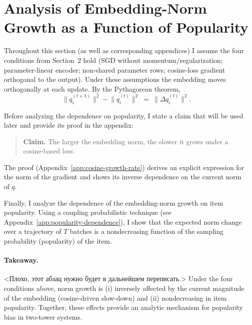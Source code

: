 \section{Analysis of Embedding-Norm Growth as a Function of Popularity}

Throughout this section (as well as corresponding appendices) I assume the four conditions from Section~2 hold (SGD without momentum/regularization; parameter-linear encoder; non-shared parameter rows; cosine-loss gradient orthogonal to the output). Under these assumptions the embedding moves orthogonally at each update. By the Pythagorean theorem,
\begin{equation}
\label{eq:pythagoras-increment}
\bigl\|q_i^{(t+1)}\bigr\|^{2} - \bigl\|q_i^{(t)}\bigr\|^{2} \;=\; \bigl\|\Delta q_i^{(t)}\bigr\|^{2}.
\end{equation}

Before analyzing the dependence on popularity, I state a claim that will be used later and provide its proof in the appendix:
\begin{quote}
\textbf{Claim.} The larger the embedding norm, the slower it grows under a cosine-based loss.
\end{quote}
The proof (Appendix~\ref{app:cosine-growth-rate}) derives an explicit expression for the norm of the gradient and shows its inverse dependence on the current norm of $q$.

Finally, I analyze the dependence of the embedding-norm growth on item popularity. Using a coupling probabilistic technique (see Appendix~\ref{app:popularity-dependence}), I show that the expected norm change over a trajectory of $T$ batches is a nondecreasing function of the sampling probability (popularity) of the item.

\paragraph{Takeaway.} <Плохо, этот абзац нужно будет в дальнейшем переписать.> Under the four conditions above, norm growth is (i) inversely affected by the current magnitude of the embedding (cosine-driven slow-down) and (ii) nondecreasing in item popularity. Together, these effects provide an analytic mechanism for popularity bias in two-tower systems.


